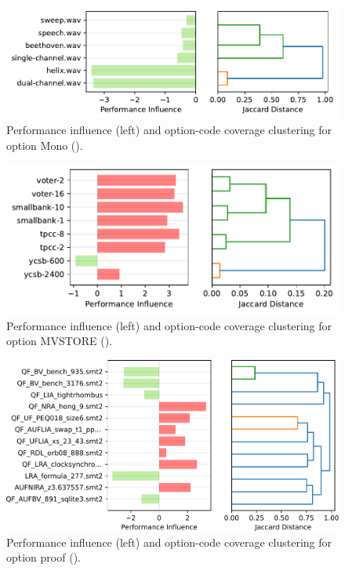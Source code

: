 {{{{\vspace{1mm}

}
\begin{figure}
	\includegraphics[width=0.999\linewidth]{rq23/Mono.pdf}
	\caption{Performance influence (left) and option-code coverage clustering for option \textsf{Mono} (\jumper).}
	\label{fig:mono_jump3r}
\end{figure}


\begin{figure}
	\includegraphics[width=0.999\linewidth]{rq23/MVSTORE.pdf}
	\caption{Performance influence (left) and option-code coverage clustering for option \textsf{MVSTORE} (\htwo).}
	\label{fig:mvstore_h2}
\end{figure}

\begin{figure}
	\includegraphics[width=0.999\linewidth]{rq23/proof.pdf}
	\caption{Performance influence (left) and option-code coverage clustering for option \textsf{proof} (\zdrei).}
	\label{fig:proof_z3}
\end{figure}

}}}
